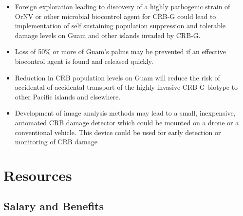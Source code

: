 \documentclass[14pt,english,letterpaper]{scrartcl}
\begin{document}
\begin{itemize}
	
	\item Foreign exploration leading to discovery of a highly pathogenic strain of OrNV or other microbial
	biocontrol agent for CRB-G could lead to implementation of self sustaining population
	suppression and tolerable damage levels on Guam and other islands invaded by CRB-G.
	
	\item Loss of 50\% or more of Guam’s palms may be prevented if an effective biocontrol agent is found
	and released quickly.
	
	\item Reduction in CRB population levels on Guam will reduce the risk of accidental of accidental transport of the highly
	invasive CRB-G biotype to other Pacific islands and elsewhere.
	
	\item Development of image analysis methods may lead to a small, inexpensive, automated CRB
	damage detector which could be mounted on a drone or a conventional vehicle. This
	device could be used for early detection or monitoring of CRB damage

\end{itemize}

\section{Resources} 


\subsection{Salary and Benefits} 

%
%
%
%
%
\end{document}
